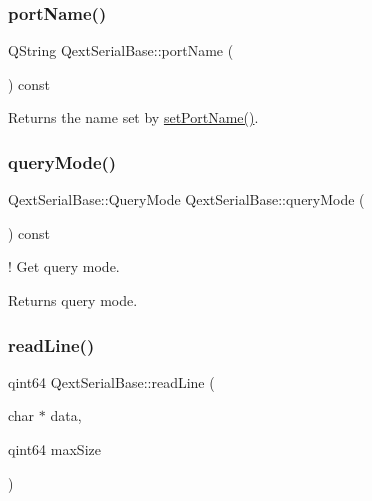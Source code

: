 \subsubsection{\texorpdfstring{port\+Name()}{portName()}}
{\footnotesize\ttfamily Q\+String Qext\+Serial\+Base\+::port\+Name (\begin{DoxyParamCaption}{ }\end{DoxyParamCaption}) const\hspace{0.3cm}{\ttfamily [virtual]}}

Returns the name set by \mbox{\hyperlink{class_qext_serial_base_a1c9f83f00f0ea53ee06b757e197cdf64}{set\+Port\+Name()}}. \mbox{\label{class_qext_serial_base_a87c78f3a69a8576b9c6a6e4c7318d70a}} 
\subsubsection{\texorpdfstring{query\+Mode()}{queryMode()}}
{\footnotesize\ttfamily Qext\+Serial\+Base\+::\+Query\+Mode Qext\+Serial\+Base\+::query\+Mode (\begin{DoxyParamCaption}{ }\end{DoxyParamCaption}) const\hspace{0.3cm}{\ttfamily [inline]}}

! Get query mode. \begin{DoxyReturn}{Returns}
query mode. 
\end{DoxyReturn}
\mbox{\label{class_qext_serial_base_aee681a896845c9594c84dcd47d7eb566}} 
\subsubsection{\texorpdfstring{read\+Line()}{readLine()}}
{\footnotesize\ttfamily qint64 Qext\+Serial\+Base\+::read\+Line (\begin{DoxyParamCaption}\item[{char $\ast$}]{data,  }\item[{qint64}]{max\+Size }\end{DoxyParamCaption})\hspace{0.3cm}{\ttfamily [virtual]}}

